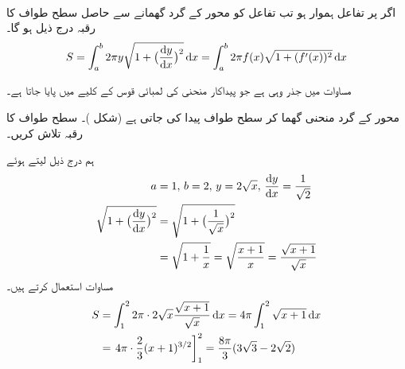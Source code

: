 \\
اگر  پر تفاعل  ہموار ہو تب تفاعل  کو محور  کے گرد گھمانے سے حاصل سطح طواف کا رقبہ درج ذیل ہو گا۔
\begin{align}\label{مساوات_تکمل_استعمال_سطحی_رقبہ_پ}                                
S=\int_a^b2\pi y\sqrt{1+\big(\frac{\dif y}{\dif x}\big)^2}\dif x=\int_a^b2\pi f(x)\sqrt{1+(f'(x))^2}\dif x
\end{align}

مساوات  میں جذر وہی ہے جو پیداکار منحنی کی لمبائی قوس کے کلیے میں پایا جاتا ہے۔

محور  کے گرد منحنی  گھما کر سطح طواف پیدا کی جاتی ہے (شکل )۔ سطح طواف کا رقبہ تلاش کریں۔

ہم درج ذیل لیتے ہوئے
\begin{align*}
a&=1,\, b=2,\, y=2\sqrt{x},\, \frac{\dif y}{\dif x}=\frac{1}{\sqrt{2}}\\
\sqrt{1+\big(\frac{\dif y}{\dif x}\big)^2}&=\sqrt{1+\big(\frac{1}{\sqrt{x}}\big)^2}\\
&=\sqrt{1+\frac{1}{x}}=\sqrt{\frac{x+1}{x}}=\frac{\sqrt{x+1}}{\sqrt{x}}
\end{align*}
 مساوات  استعمال کرتے ہیں۔
\begin{align*}
S&=\int_1^22\pi \cdot2\sqrt{x}\frac{\sqrt{x+1}}{\sqrt{x}}\dif x=4\pi\int_1^2\sqrt{x+1}\dif x\\
&=\left.4\pi\cdot\frac{2}{3}(x+1)^{3/2}\right]_1^2=\frac{8\pi}{3}(3\sqrt{3}-2\sqrt{2})
\end{align*}


